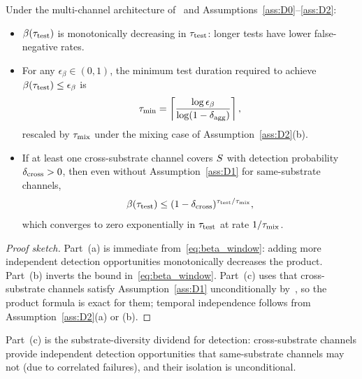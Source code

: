 \begin{proposition}
\label{prop:detection_bounds}
Under the multi-channel architecture
of~\citep[Table~1]{lasser2026scm} and
Assumptions~\ref{ass:D0}--\ref{ass:D2}:
\begin{itemize}
\item[(a)] $\beta(\tau_{\mathrm{test}})$ is monotonically decreasing in
  $\tau_{\mathrm{test}}$: longer tests have lower false-negative rates.
\item[(b)] For any $\epsilon_\beta \in (0, 1)$, the minimum test
  duration required to achieve $\beta(\tau_{\mathrm{test}}) \leq
  \epsilon_\beta$ is
  \begin{equation}
  \label{eq:tau_min}
  \tau_{\mathrm{min}} = \left\lceil
    \frac{\log \epsilon_\beta}{\log(1 - \delta_{\mathrm{agg}})}
  \right\rceil,
  \end{equation}
  rescaled by $\tau_{\mathrm{mix}}$ under the mixing case of
  Assumption~\ref{ass:D2}(b).
\item[(c)] If at least one cross-substrate channel covers
  $S$ with detection probability $\delta_{\mathrm{cross}} > 0$, then
  even without Assumption~\ref{ass:D1} for same-substrate
  channels,
  \begin{equation}
  \label{eq:cross_substrate_bound}
  \beta(\tau_{\mathrm{test}}) \leq (1 - \delta_{\mathrm{cross}})^{\tau_{\mathrm{test}} / \tau_{\mathrm{mix}}},
  \end{equation}
  which converges to zero exponentially in $\tau_{\mathrm{test}}$ at rate
  $1/\tau_{\mathrm{mix}}$.
\end{itemize}
\end{proposition}

\begin{proof}[Proof sketch]
Part~(a) is immediate from~\eqref{eq:beta_window}: adding more
independent detection opportunities monotonically decreases the
product.  Part~(b) inverts the bound
in~\eqref{eq:beta_window}.  Part~(c) uses that cross-substrate
channels satisfy Assumption~\ref{ass:D1} unconditionally
by~\citep[Proposition~5]{lasser2026exo}, so the product formula
is exact for them; temporal independence follows from
Assumption~\ref{ass:D2}(a) or (b).
\end{proof}

Part~(c) is the substrate-diversity dividend for detection:
cross-substrate channels provide independent detection
opportunities that same-substrate channels may not (due to
correlated failures), and their isolation is unconditional.

